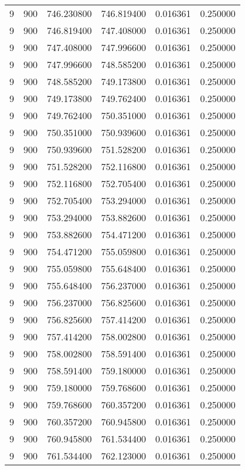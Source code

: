 \begin{longtable}{rrrrrr}
9 & 900 & 746.230800 & 746.819400 & 0.016361 & 0.250000 \\
9 & 900 & 746.819400 & 747.408000 & 0.016361 & 0.250000 \\
9 & 900 & 747.408000 & 747.996600 & 0.016361 & 0.250000 \\
9 & 900 & 747.996600 & 748.585200 & 0.016361 & 0.250000 \\
9 & 900 & 748.585200 & 749.173800 & 0.016361 & 0.250000 \\
9 & 900 & 749.173800 & 749.762400 & 0.016361 & 0.250000 \\
9 & 900 & 749.762400 & 750.351000 & 0.016361 & 0.250000 \\
9 & 900 & 750.351000 & 750.939600 & 0.016361 & 0.250000 \\
9 & 900 & 750.939600 & 751.528200 & 0.016361 & 0.250000 \\
9 & 900 & 751.528200 & 752.116800 & 0.016361 & 0.250000 \\
9 & 900 & 752.116800 & 752.705400 & 0.016361 & 0.250000 \\
9 & 900 & 752.705400 & 753.294000 & 0.016361 & 0.250000 \\
9 & 900 & 753.294000 & 753.882600 & 0.016361 & 0.250000 \\
9 & 900 & 753.882600 & 754.471200 & 0.016361 & 0.250000 \\
9 & 900 & 754.471200 & 755.059800 & 0.016361 & 0.250000 \\
9 & 900 & 755.059800 & 755.648400 & 0.016361 & 0.250000 \\
9 & 900 & 755.648400 & 756.237000 & 0.016361 & 0.250000 \\
9 & 900 & 756.237000 & 756.825600 & 0.016361 & 0.250000 \\
9 & 900 & 756.825600 & 757.414200 & 0.016361 & 0.250000 \\
9 & 900 & 757.414200 & 758.002800 & 0.016361 & 0.250000 \\
9 & 900 & 758.002800 & 758.591400 & 0.016361 & 0.250000 \\
9 & 900 & 758.591400 & 759.180000 & 0.016361 & 0.250000 \\
9 & 900 & 759.180000 & 759.768600 & 0.016361 & 0.250000 \\
9 & 900 & 759.768600 & 760.357200 & 0.016361 & 0.250000 \\
9 & 900 & 760.357200 & 760.945800 & 0.016361 & 0.250000 \\
9 & 900 & 760.945800 & 761.534400 & 0.016361 & 0.250000 \\
9 & 900 & 761.534400 & 762.123000 & 0.016361 & 0.250000 \\

\end{longtable}
